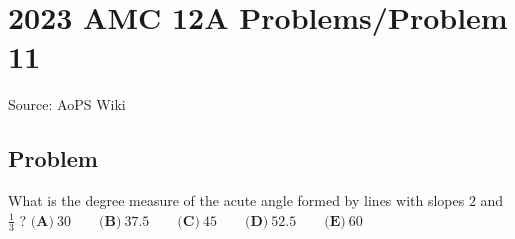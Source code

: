 \documentclass[12pt]{article}
\begin{document}
\section*{{2023 AMC 12A Problems/Problem 11}}
Source: AoPS Wiki

\subsection*{Problem}
What is the degree measure of the acute angle formed by lines with slopes $2$ and $\frac{1}{3}$ ? $\textbf{(A)} ~30\qquad\textbf{(B)} ~37.5\qquad\textbf{(C)} ~45\qquad\textbf{(D)} ~52.5\qquad\textbf{(E)} ~60$
\end{document}
